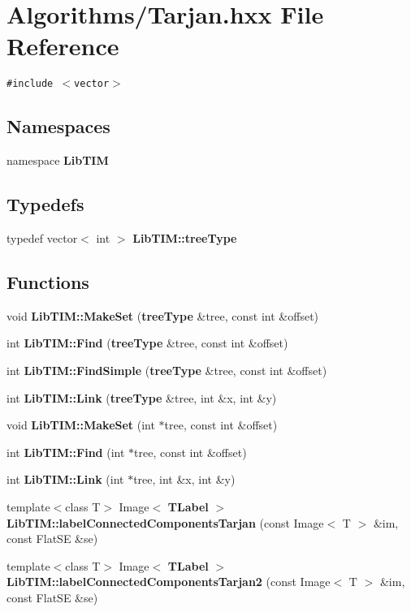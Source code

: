 \section{Algorithms/Tarjan.hxx File Reference}
\label{Tarjan_8hxx}
{\tt \#include $<$vector$>$}\par
\subsection*{Namespaces}
\begin{CompactItemize}
\item 
namespace {\bf Lib\-TIM}
\end{CompactItemize}
\subsection*{Typedefs}
\begin{CompactItemize}
\item 
typedef vector$<$ int $>$ {\bf Lib\-TIM::tree\-Type}
\end{CompactItemize}
\subsection*{Functions}
\begin{CompactItemize}
\item 
void {\bf Lib\-TIM::Make\-Set} ({\bf tree\-Type} \&tree, const int \&offset)
\item 
int {\bf Lib\-TIM::Find} ({\bf tree\-Type} \&tree, const int \&offset)
\item 
int {\bf Lib\-TIM::Find\-Simple} ({\bf tree\-Type} \&tree, const int \&offset)
\item 
int {\bf Lib\-TIM::Link} ({\bf tree\-Type} \&tree, int \&x, int \&y)
\item 
void {\bf Lib\-TIM::Make\-Set} (int $\ast$tree, const int \&offset)
\item 
int {\bf Lib\-TIM::Find} (int $\ast$tree, const int \&offset)
\item 
int {\bf Lib\-TIM::Link} (int $\ast$tree, int \&x, int \&y)
\item 
template$<$class T$>$ Image$<$ {\bf TLabel} $>$ {\bf Lib\-TIM::label\-Connected\-Components\-Tarjan} (const Image$<$ T $>$ \&im, const Flat\-SE \&se)
\item 
template$<$class T$>$ Image$<$ {\bf TLabel} $>$ {\bf Lib\-TIM::label\-Connected\-Components\-Tarjan2} (const Image$<$ T $>$ \&im, const Flat\-SE \&se)
\end{CompactItemize}
